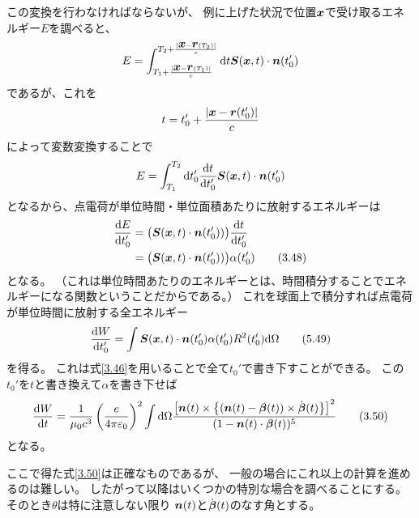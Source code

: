 \documentclass[a4paper, 10pt]{jsarticle}
\theoremstyle{definition}
\def\vec#1{\mbox{\boldmath $#1$}}
\newcommand{\dif}[2]{\frac{{\rm d} #1}{{\rm d} #2}}
\newcommand{\ddif}{{\rm d}}
\begin{document}
この変換を行わなければならないが、
例に上げた状況で位置$\vec{x}$で受け取るエネルギー$E$を調べると、
\begin{align}
	E = \int_{T_1 + \frac{|\vec{x} - \vec{r}(T_1)|}{c}}
	^{T_2 + \frac{|\vec{x} - \vec{r}(T_2)|}{c}} \ddif t
	\vec{S}(\vec{x}, t) \cdot \vec{n}(t_0')
\end{align}
であるが、これを
\begin{align}
	t = t_0' + \frac{|\vec{x} - \vec{r}(t_0')|}{c}
\end{align}
によって変数変換することで
\begin{align}
	E = \int_{T_1}^{T_2} \ddif t_0'
	\dif{t}{t_0'} \vec{S}(\vec{x}, t) \cdot \vec{n}(t_0')
\end{align}
となるから、点電荷が単位時間・単位面積あたりに放射するエネルギーは
\begin{align}
	\dif{E}{t_0'} &= \bigl( \vec{S}(\vec{x}, t) \cdot \vec{n}(t_0') )\bigr)
	\dif{t}{t_0'} \\
	&= \bigl( \vec{S}(\vec{x}, t) \cdot \vec{n}(t_0') )\bigr) \alpha(t_0')
	\tag{3.48} \label{3.48}
\end{align}
となる。
（これは単位時間あたりのエネルギーとは、時間積分することでエネルギーになる関数ということだからである。）
これを球面上で積分すれば点電荷が単位時間に放射する全エネルギー
\begin{align}
	\dif{W}{t_0'} = \int \vec{S}(\vec{x}, t) \cdot \vec{n}(t_0') \alpha(t_0')
	R^2(t_0') \ddif \Omega
	\tag{5.49} \label{5.49}
\end{align}
を得る。
これは式\eqref{3.46}を用いることで全て$t_0'$で書き下すことができる。
この$t_0'$を$t$と書き換えて$\alpha$を書き下せば
\begin{align}
	\dif{W}{t} = \frac{1}{\mu_0 c^3} \left( \frac{e}{4\pi \varepsilon_0} \right)^2
	\int \ddif \Omega \frac{\left[ \vec{n}(t) \times \left\{
		\left(\vec{n}(t) - \vec{\beta}(t)\right) \times \dot{\vec{\beta}}(t) 
	\right\} \right]^2}
	{(1 - \vec{n}(t) \cdot \vec{\beta}(t))^5}
	\tag{3.50} \label{3.50}
\end{align}
となる。

ここで得た式\eqref{3.50}は正確なものであるが、
一般の場合にこれ以上の計算を進めるのは難しい。
したがって以降はいくつかの特別な場合を調べることにする。
そのとき$\theta$は特に注意しない限り
$\vec{n}(t)$と$\dot{\vec{\beta}}(t)$のなす角とする。
\end{document}
